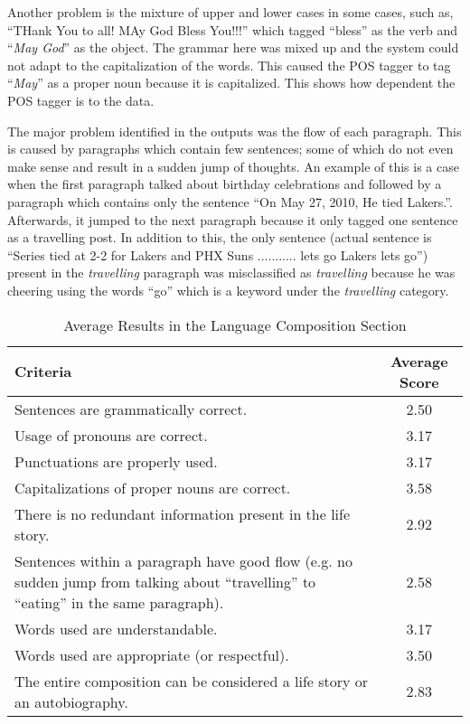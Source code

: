 Another problem is the mixture of upper and lower cases in some cases, such as, ``THank You to all! MAy God Bless You!!!'' which tagged ``bless'' as the verb and ``\textit{May God}'' as the object. The grammar here was mixed up and the system could not adapt to the capitalization of the words. This caused the POS tagger to tag ``\textit{May}'' as a proper noun because it is capitalized. This shows how dependent the POS tagger is to the data.

The major problem identified in the outputs was the flow of each paragraph. This is caused by paragraphs which contain few sentences; some of which do not even make sense and result in a sudden jump of thoughts. An example of this is a case when the first paragraph talked about birthday celebrations and followed by a paragraph which contains only the sentence ``On May 27, 2010, He tied Lakers.''. Afterwards, it jumped to the next paragraph because it only tagged one sentence as a travelling post. In addition to this, the only sentence (actual sentence is ``Series tied at 2-2 for Lakers and PHX Suns ........... lets go Lakers lets go'') present in the \textit{travelling} paragraph was misclassified as \textit{travelling} because he was cheering using the words ``go'' which is a keyword under the \textit{travelling} category.

\begin{table}[ph!]   %
	\centering
	\caption{Average Results in the Language Composition Section} \vspace{0.25em}
	\begin{tabular}{|p{2.5in}|c|} \hline
		\centering Criteria & Average Score \\ \hline
		Sentences are grammatically correct. & 2.50 \\ \hline 
		Usage of pronouns are correct. & 3.17 \\ \hline
		Punctuations are properly used. & 3.17 \\ \hline
		Capitalizations of proper nouns are correct. & 3.58 \\ \hline
		There is no redundant information present in the life story. & 2.92 \\ \hline
		Sentences within a paragraph have good flow (e.g. no sudden jump from talking about “travelling'' to “eating'' in the same paragraph). & 2.58 \\ \hline
		Words used are understandable. & 3.17 \\ \hline
		Words used are appropriate (or respectful). & 3.50 \\ \hline
		The entire composition can be considered a life story or an autobiography. & 2.83 \\ \hline
	\end{tabular}
	\label{tab:criteria1}
\end{table}

